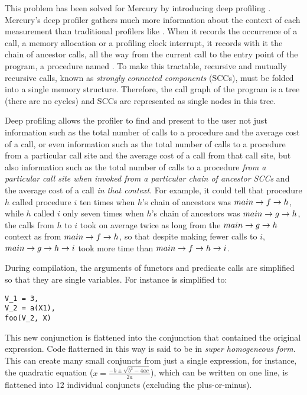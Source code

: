This problem has been solved for Mercury by introducing deep profiling
\citep{conway:2001:mercury-deep}.
Mercury's deep profiler gathers much more information about the context of
each measurement than traditional profilers like  \citep{gprof}.
When it records the occurrence of a call,
a memory allocation or a profiling clock interrupt,
it records with it the chain of ancestor calls,
all the way from the current call to the entry point of the program,
a procedure named .
To make this tractable,
recursive and mutually recursive calls,
known as \emph{strongly connected components} (SCCs),
must be folded into a single memory structure.
Therefore, the call graph of the program is a tree (there are no cycles)
and SCCs are represented as single nodes in this tree.

Deep profiling allows the profiler to find and present to the user
not just information such as the total number of calls to a procedure
and the average cost of a call,
or even information such as the total number of calls to a procedure
from a particular call site and the average cost of a call from that call site,
but also information such as the total number of calls to a procedure
\emph{from a particular call site
when invoked from a particular chain of ancestor SCCs}
and the average cost of a call \emph{in that context}.
For example, it could tell that
procedure $h$ called procedure $i$ ten times
when $h$'s chain of ancestors was $main \rightarrow f \rightarrow h$,
while $h$ called $i$ only seven times
when $h$'s chain of ancestors was $main \rightarrow g \rightarrow h$,
the calls from $h$ to $i$ took on average twice as long
from the $main \rightarrow g \rightarrow h$ context as from $main \rightarrow f \rightarrow h$,
so that despite making fewer calls to $i$,
$main \rightarrow g \rightarrow h \rightarrow i$ took more time than $main \rightarrow f \rightarrow h \rightarrow i$.

During compilation, the arguments of functors and predicate calls are
simplified so that they are single variables.
For instance  is simplified to:

\begin{verbatim}
V_1 = 3,
V_2 = a(X1),
foo(V_2, X)
\end{verbatim}

\noindent
This new conjunction is flattened into the conjunction that contained the
original expression.
Code flatterned in this way is said to be in
\emph{super homogeneous form}.
This can create many small conjuncts from just a single expression,
for instance, the quadratic equation
($x=\frac{-b \pm \sqrt {b^2-4ac}}{2a}$), which can be written on one line,
is flattened into 12 individual conjuncts (excluding the plus-or-minus).

